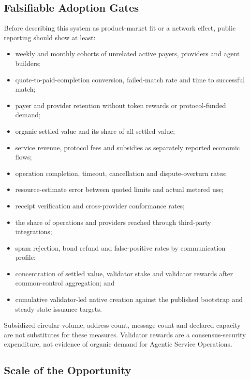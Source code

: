 \documentclass[11pt,oneside]{article}
\begin{document}
\subsection{Falsifiable Adoption Gates}

Before describing this system as product-market fit or a network effect, public reporting
should show at least:

\begin{itemize}
  \item weekly and monthly cohorts of unrelated active payers, providers and agent builders;
  \item quote-to-paid-completion conversion, failed-match rate and time to successful match;
  \item payer and provider retention without token rewards or protocol-funded demand;
  \item organic settled value and its share of all settled value;
  \item service revenue, protocol fees and subsidies as separately reported economic flows;
  \item operation completion, timeout, cancellation and dispute-overturn rates;
  \item resource-estimate error between quoted limits and actual metered use;
  \item receipt verification and cross-provider conformance rates;
  \item the share of operations and providers reached through third-party integrations;
  \item spam rejection, bond refund and false-positive rates by communication profile;
  \item concentration of settled value, validator stake and validator rewards after
        common-control aggregation; and
  \item cumulative validator-led native creation against the published bootstrap and
        steady-state issuance targets.
\end{itemize}

Subsidized circular volume, address count, message count and declared capacity are not
substitutes for these measures. Validator rewards are a consensus-security expenditure, not
evidence of organic demand for Agentic Service Operations.

\subsection{Scale of the Opportunity}
\end{document}
